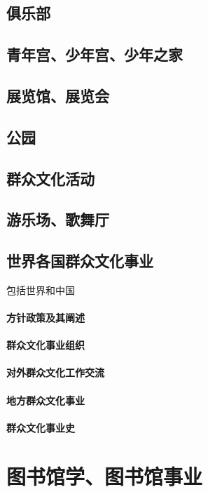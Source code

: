 \documentclass[UTF8]{../../ApplicationUniverse}
\begin{document}
\section{俱乐部}
\section{青年宫、少年宫、少年之家}
\section{展览馆、展览会}
\section{公园}
\section{群众文化活动}
\section{游乐场、歌舞厅}

\section{世界各国群众文化事业}

    包括世界和中国
    \subsubsection{方针政策及其阐述}
    \subsubsection{群众文化事业组织}
    \subsubsection{对外群众文化工作交流}
    \subsubsection{地方群众文化事业}
    \subsubsection{群众文化事业史}







\chapter{图书馆学、图书馆事业}
\end{document}
